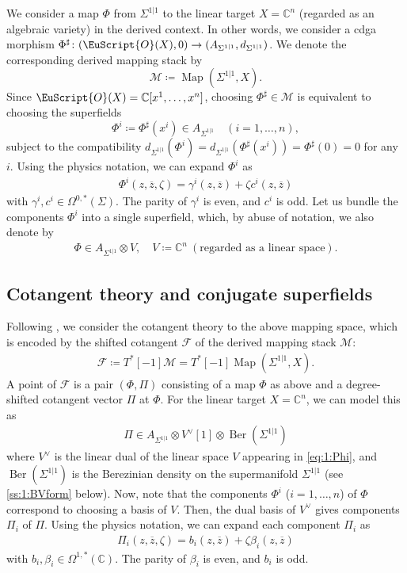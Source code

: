 \documentclass[final,reqno]{amsart}
\numberwithin{equation}{section}
\theoremstyle{definition}
\newcommand{\ol}{\overline}
\newcommand{\ceq}{\coloneqq} %
\newcommand{\bbC}{\mathbb{C}}
\newcommand{\clF}{\mathcal{F}}
\newcommand{\clM}{\mathcal{M}}
\newcommand{\shO}{\EuScript{O}}
\newcommand{\sSig}{\Sigma^{1|1}}
\DeclareMathOperator{\Ber}{Ber}
\DeclareMathOperator{\Map}{Map}
\begin{document}
We consider a map $\Phi$ from $\sSig$ to the linear target $X=\bbC^n$ 
(regarded as an algebraic variety) in the derived context.
In other words, we consider a cdga morphism 
$\Phi^\sharp\colon (\shO(X),0) \to (A_{\sSig},d_{\sSig})$.
We denote the corresponding derived mapping stack by 
\[
 \clM \ceq \Map(\sSig, X).
\]
Since $\shO(X)=\bbC[x^1,\dotsc,x^n]$, 
choosing $\Phi^{\sharp} \in \clM$ is equivalent to choosing the superfields
\[
 \Phi^i \ceq \Phi^\sharp(x^i)\in A_{\sSig} \quad (i=1,\dotsc,n),
\]
subject to the compatibility 
$d_{\sSig}(\Phi^i)=d_{\sSig}(\Phi^\sharp(x^i))=\Phi^\sharp(0)=0$ for any $i$.
Using the physics notation, we can expand $\Phi^i$ as
\begin{align}\label{eq:1:Phii}
 \Phi^i(z,\ol{z},\zeta) = \gamma^i(z,\ol{z}) + \zeta c^i(z,\ol{z})
\end{align}
with $\gamma^i,c^i\in\Omega^{0,*}(\Sigma)$.
The parity of $\gamma^i$ is even, and $c^i$ is odd.
Let us bundle the components $\Phi^i$ into a single superfield, 
which, by abuse of notation, we also denote by
\begin{align}\label{eq:1:Phi}
 \Phi \in A_{\sSig} \otimes V, \quad 
 V \ceq \bbC^n \ (\text{regarded as a linear space}).
\end{align}


\subsection{Cotangent theory and conjugate superfields}\label{ss:1:BVth}

Following \cite{CG2}, we consider the cotangent theory to the above mapping space,
which is encoded by 
the shifted cotangent $\clF$ of the derived mapping stack $\clM$: 
\begin{align}\label{eq:1:clF}
 \clF \ceq T^*[-1]\clM = T^*[-1]\Map(\sSig,X).
\end{align}
A point of $\clF$ is a pair $(\Phi,\Pi)$ consisting of 
a map $\Phi$ as above and a degree-shifted cotangent vector $\Pi$ at $\Phi$.
For the linear target $X=\bbC^n$, we can model this as
\begin{align}\label{eq:1:B}
 \Pi \in A_{\sSig} \otimes V^\vee[1] \otimes \Ber(\sSig)
\end{align}
where $V^\vee$ is the linear dual of the linear space $V$ 
appearing in \eqref{eq:1:Phi},
and $\Ber(\sSig)$ is the Berezinian density on the supermanifold $\sSig$
(see \cref{ss:1:BVform} below).
Now, note that the components $\Phi^i$ ($i=1,\dotsc,n$) 
of $\Phi$ correspond to choosing a basis of $V$.
Then, the dual basis of $V^\vee$ gives components $\Pi_i$ of $\Pi$.
Using the physics notation, we can expand each component $\Pi_i$ as
\begin{align}\label{eq:1:Pii}
 \Pi_i(z,\ol{z},\zeta) = b_i(z,\ol{z}) + \zeta \beta_i(z,\ol{z})
\end{align}
with $b_i,\beta_i\in\Omega^{1,*}(\bbC)$.
The parity of $\beta_i$ is even, and $b_i$ is odd.
\end{document}
